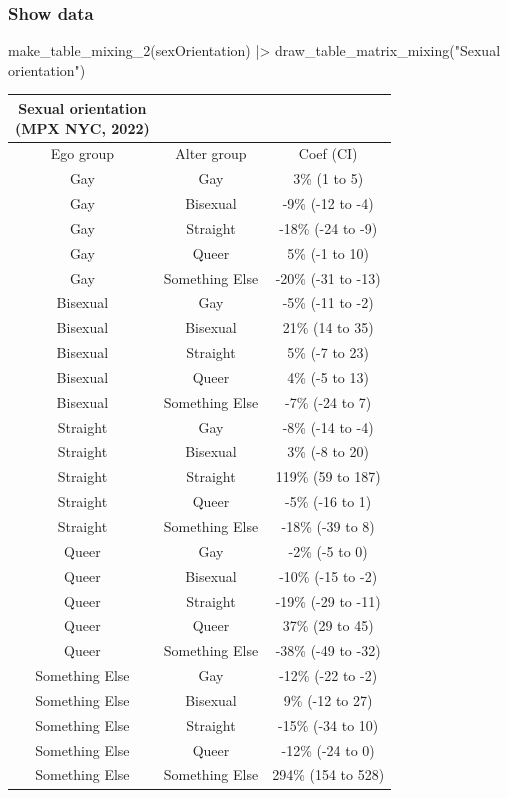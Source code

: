 \documentclass[
  letterpaper,
  DIV=11,
  numbers=noendperiod,
  oneside]{scrreprt}
\newenvironment{Shaded}{\begin{snugshade}}{\end{snugshade}}
\newcommand{\FunctionTok}[1]{\textcolor[rgb]{0.28,0.35,0.67}{#1}}
\newcommand{\NormalTok}[1]{\textcolor[rgb]{0.00,0.23,0.31}{#1}}
\newcommand{\SpecialCharTok}[1]{\textcolor[rgb]{0.37,0.37,0.37}{#1}}
\newcommand{\StringTok}[1]{\textcolor[rgb]{0.13,0.47,0.30}{#1}}
\begin{document}
\subsubsection{Show data}

\begin{Shaded}
\begin{Highlighting}[]
\FunctionTok{make\_table\_mixing\_2}\NormalTok{(sexOrientation) }\SpecialCharTok{|\textgreater{}}
 \FunctionTok{draw\_table\_matrix\_mixing}\NormalTok{(}\StringTok{"Sexual orientation"}\NormalTok{)  }
\end{Highlighting}
\end{Shaded}

\begin{longtable*}{ccc}
\caption*{
{\large Sexual orientation} \\ 
{\small (MPX NYC, 2022)}
} \\ 
\toprule
Ego group & Alter group & Coef (CI) \\ 
\midrule\addlinespace[2.5pt]
Gay & Gay & 3\% (1 to 5)  \\ 
Gay & Bisexual & -9\% (-12 to -4)  \\ 
Gay & Straight & -18\% (-24 to -9)  \\ 
Gay & Queer & 5\% (-1 to 10)  \\ 
Gay & Something Else & -20\% (-31 to -13)  \\ 
Bisexual & Gay & -5\% (-11 to -2)  \\ 
Bisexual & Bisexual & 21\% (14 to 35)  \\ 
Bisexual & Straight & 5\% (-7 to 23)  \\ 
Bisexual & Queer & 4\% (-5 to 13)  \\ 
Bisexual & Something Else & -7\% (-24 to 7)  \\ 
Straight & Gay & -8\% (-14 to -4)  \\ 
Straight & Bisexual & 3\% (-8 to 20)  \\ 
Straight & Straight & 119\% (59 to 187)  \\ 
Straight & Queer & -5\% (-16 to 1)  \\ 
Straight & Something Else & -18\% (-39 to 8)  \\ 
Queer & Gay & -2\% (-5 to 0)  \\ 
Queer & Bisexual & -10\% (-15 to -2)  \\ 
Queer & Straight & -19\% (-29 to -11)  \\ 
Queer & Queer & 37\% (29 to 45)  \\ 
Queer & Something Else & -38\% (-49 to -32)  \\ 
Something Else & Gay & -12\% (-22 to -2)  \\ 
Something Else & Bisexual & 9\% (-12 to 27)  \\ 
Something Else & Straight & -15\% (-34 to 10)  \\ 
Something Else & Queer & -12\% (-24 to 0)  \\ 
Something Else & Something Else & 294\% (154 to 528)  \\ 
\bottomrule
\end{longtable*}
\end{document}
